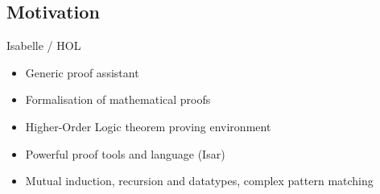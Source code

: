 \documentclass{beamer}
\theoremstyle{definition}
\begin{document}
\subsection{Motivation}
\begin{frame}
\vfill
{}
\end{frame}

\begin{frame}
  \begin{center}
    Isabelle / HOL
  \end{center}
  \begin{itemize}
    \item Generic proof assistant
    \vfill
    \item Formalisation of mathematical proofs
    \vfill
    \item Higher-Order Logic theorem proving environment
    \vfill
    \item Powerful proof tools and language (Isar) %
    \vfill
    \item Mutual induction, recursion and datatypes, complex pattern matching
  \end{itemize}
\end{frame}
\end{document}
